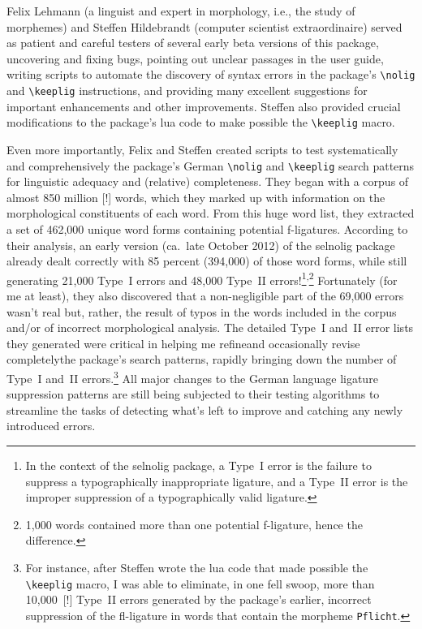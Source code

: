 \documentclass[11pt]{article}
\newcommand{\pkg}[1]{\textsf{#1}}
\newcommand{\opt}[1]{\texttt{#1}}
\newcommand{\cmmd}[1]{\texttt{\textbackslash #1}}
\begin{document}
Felix Lehmann (a linguist and expert in morphology, i.e., the study of morphemes) and Steffen Hildebrandt (computer scientist extraordinaire) served as patient and careful testers of several early beta versions of this package, uncovering and fixing bugs, pointing out unclear passages in the user guide, writing scripts to automate the discovery of syntax errors in the package's \cmmd{nolig} and \cmmd{keeplig} instructions, and providing many excellent suggestions for important enhancements and other improvements. Steffen also provided crucial modifications to the package's lua code to make possible the \cmmd{keeplig} macro.

Even more importantly, Felix and Steffen created scripts to test systematically and comprehensively the package's German \cmmd{nolig} and \cmmd{keeplig} search patterns for linguistic adequacy and (relative) completeness.
They began with a corpus of almost 850 million [!] words, which they marked up with information on the morphological constituents of each word. From this huge word list, they extracted a set of 462,000 unique word forms containing potential f-ligatures.
According to their analysis, an early version (ca.\ late October 2012) of the \pkg{selnolig} package already dealt correctly with 85 percent (394,000) of those word forms, while still generating 21,000 Type~I errors and 48,000 Type~II errors!\footnote{In the context of the \pkg{selnolig} package, a Type~I error is the failure to suppress a typographically inappropriate ligature, and a Type~II error is the improper suppression of a typographically valid ligature.}\textsuperscript{,}\footnote{1,000 words contained more than one potential f-ligature, hence the difference.} 
Fortunately (for me at least), they also discovered that a non-negligible part of the 69,000 errors wasn't real but, rather, the result of typos in the words included in the corpus and/or of incorrect morphological analysis. The detailed Type~I and~II error lists they generated were critical in helping me refine\textemdash and occasionally revise completely\textemdash the package's search patterns, rapidly bringing down the number of Type~I and~II errors.\footnote{For instance, after Steffen wrote the lua code that made possible the \cmmd{keeplig} macro, I was able to eliminate, in one fell swoop, more than 10,000~[!] Type~II errors generated by the package's earlier, incorrect suppression of the fl-ligature in words that contain the morpheme \opt{Pflicht}. } All major changes to the German language ligature suppression patterns are still being subjected to their testing algorithms to streamline the tasks of detecting what's left to improve and catching any newly introduced errors.
\end{document}

